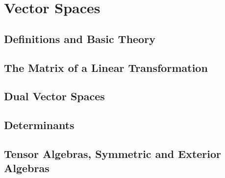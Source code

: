 \chapter{Vector Spaces}

\section{Definitions and Basic Theory}

\section{The Matrix of a Linear Transformation}

\section{Dual Vector Spaces}

\section{Determinants}

\section{Tensor Algebras, Symmetric and Exterior Algebras}

